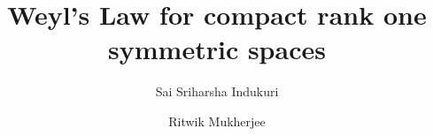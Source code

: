 \documentclass[11pt,lettersize,reqno,fullpage]{amsart}
\begin{document}
\title[Weyl's Law for compact rank one symmetric spaces]{Weyl's Law for compact rank one symmetric spaces}



\author[Sai Sriharsha Indukuri]{Sai Sriharsha Indukuri}
\address{Department of Mathematics, Washington University in St.Louis, St.Louis 63105, Missouri, USA.}


\author[Ritwik Mukherjee]{Ritwik Mukherjee}
\address{School of Mathematical Sciences, National Institute of Science Education and Research, Bhubaneswar, An OCC of Homi Bhabha National Institute,
Khurda 752050, Odisha, India.}






\date{}


\maketitle
\end{document}
